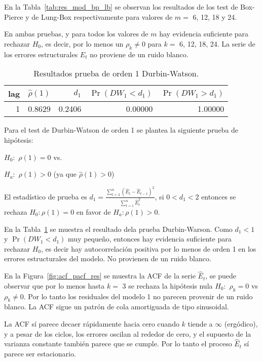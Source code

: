 \documentclass[11pt, letterpaper, twoside]{article}
\begin{document}
En la Tabla~\ref{tab:res_mod_bp_lb} se observan los resultados de los test de Box-Pierce y de Lung-Box respectivamente para valores de $m=$ 6, 12, 18 y 24.

En ambas pruebas, y para todos los valores de $m$ hay evidencia suficiente para rechazar $H_0$, es decir, por lo menos un $\rho_k \neq 0$ para $k=$ 6, 12, 18, 24. La serie de los errores estructurales $\hat{E}_t$ no proviene de un ruido blanco.

\begin{table}[ht!]
\centering
\begin{tabular}{rrrrr}
lag & $\hat{\rho}(1)$ & $d_1$ & $\Pr(DW_1 < d_1)$ & $\Pr(DW_1 > d_1)$ \\
  \hline
1 & 0.8629 & 0.2406 & 0.00000 & 1.00000 \\
   \hline
\end{tabular}
\caption{Resultados prueba de orden 1 Durbin-Watson.}
\label{tab:res_mod_db}
\end{table}

Para el test de Durbin-Watson de orden 1 se plantea la siguiente prueba de hipótesis:

$H_0:$ $\rho(1)=0$ vs.

$H_a:$ $\rho(1)>0$ (ya que $\hat{\rho}(1)>0$)

El estadístico de prueba es $d_1 = \frac{\sum_{t=2}^n (\hat{E}_t - \hat{E}_{t-1})^2}{\sum_{t=1}^n \hat{E}_t^2}$, si $0<d_1<2$ entonces se rechaza $H_0: \rho(1)=0$ en favor de $H_a: \rho(1)>0$.

En la Tabla~\ref{tab:res_mod_db} se muestra el resultado dela prueba Durbin-Warson. Como $d_1 < 1$ y $\Pr(DW_1 < d_1)$ muy pequeño, entonces hay evidencia suficiente para rechazar $H_0$, es decir hay autocorrelación positiva por lo menos de orden 1 en los errores estructurales del modelo. No provienen de un ruido blanco.

En la Figura~\ref{fig:acf_pacf_res} se muestra la ACF de la serie $\hat{E}_t$, se puede observar que por lo menos hasta $k=$ 3 se rechaza la hipótesis nula $H_0:$ $\rho_k = 0$ vs  $\rho_k \neq 0$. Por lo tanto los residuales del modelo 1 no parecen provenir de un ruido blanco. La ACF sigue un patrón de cola amortiguada de tipo sinusoidal.

La ACF sí parece decaer rápidamente hacia cero cuando $k$ tiende a $\infty$ (ergódico), y a pesar de los ciclos, los errores oscilan al rededor de cero, y el supuesto de la varianza constante también parece que se cumple. Por lo tanto el proceso $\hat{E}_t$ sí parece ser estacionario.
\end{document}
